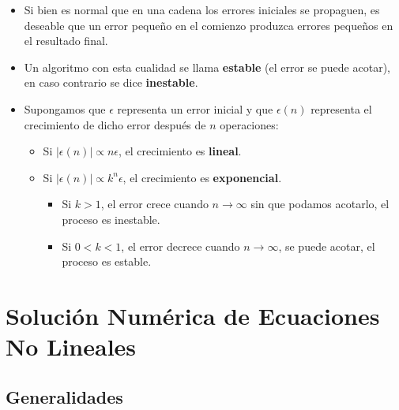 \documentclass[openany]{book}
\providecommand{\tightlist}{%
  \setlength{\itemsep}{0pt}\setlength{\parskip}{0pt}}
\begin{document}
\begin{itemize}
\item
  Si bien es normal que en una cadena los errores iniciales se propaguen, es deseable que un error pequeño en el comienzo produzca errores pequeños en el resultado final.
\item
  Un algoritmo con esta cualidad se llama \textbf{estable} (el error se puede acotar), en caso contrario se dice \textbf{inestable}.
\item
  Supongamos que \(\epsilon\) representa un error inicial y que \(\epsilon (n)\) representa el crecimiento de dicho error después de \(n\) operaciones:

  \begin{itemize}
  \tightlist
  \item
    Si \(|\epsilon (n)| \propto n \epsilon\), el crecimiento es \textbf{lineal}.
  \item
    Si \(|\epsilon (n)| \propto k^n \epsilon\), el crecimiento es \textbf{exponencial}.

    \begin{itemize}
    \tightlist
    \item
      Si \(k > 1\), el error crece cuando \(n \rightarrow \infty\) sin que podamos acotarlo, el proceso es inestable.
    \item
      Si \(0 < k < 1\), el error decrece cuando \(n \rightarrow \infty\), se puede acotar, el proceso es estable.
    \end{itemize}
  \end{itemize}
\end{itemize}

\hypertarget{soluciuxf3n-numuxe9rica-de-ecuaciones-no-lineales}{%
\chapter{Solución Numérica de Ecuaciones No Lineales}\label{soluciuxf3n-numuxe9rica-de-ecuaciones-no-lineales}}

\hypertarget{generalidades}{%
\section{Generalidades}\label{generalidades}}
\end{document}
